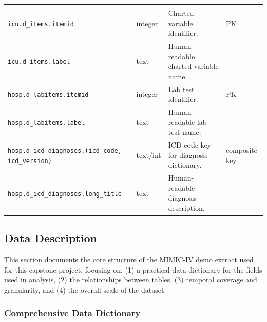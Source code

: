 \documentclass[12pt]{article}
\begin{document}
\begin{longtable}{@{}
L{0.30\textwidth}
L{0.12\textwidth}
L{0.45\textwidth}
L{0.15\textwidth}
@{}}
\addlinespace[0.9em]

\\
\texttt{icu.d\_items.itemid} & integer & Charted variable identifier. & PK \\
\texttt{icu.d\_items.label} & text & Human-readable charted variable name. & -- \\
\texttt{hosp.d\_labitems.itemid} & integer & Lab test identifier. & PK \\
\texttt{hosp.d\_labitems.label} & text & Human-readable lab test name. & -- \\
\texttt{hosp.d\_icd\_diagnoses.(icd\_code, icd\_version)} & text/int & ICD code key for diagnosis dictionary. & composite key \\
\texttt{hosp.d\_icd\_diagnoses.long\_title} & text & Human-readable diagnosis description. & -- \\

\end{longtable}
\endgroup


\subsection{Data Description}

This section documents the core structure of the MIMIC-IV demo extract used for this capstone project, focusing on: (1) a practical data dictionary for the fields used in analysis, (2) the relationships between tables, (3) temporal coverage and granularity, and (4) the overall scale of the dataset.

%
%

\subsubsection{Comprehensive Data Dictionary}
\end{document}
